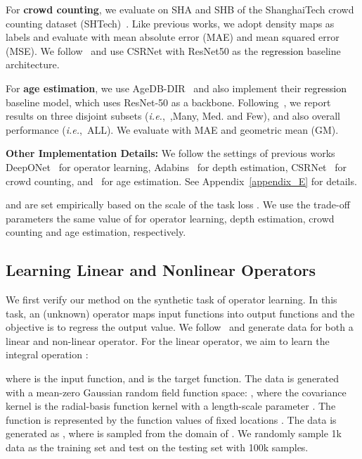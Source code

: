 \documentclass{article} \usepackage{iclr2023_conference,times}
\makeatletter
\newcommand*{\ie}{i.e.\@\xspace}
\def\ie{\mbox{\textit{i.e.}, }}
\def\shihao{\textcolor{black}}
\makeatother
\begin{document}
For \textbf{crowd counting}, we evaluate on SHA and SHB of the ShanghaiTech crowd counting dataset (SHTech)~\citep{zhang2015cross}. Like previous works, we adopt density maps as labels and evaluate with mean absolute error (MAE) and mean squared error (MSE).  We follow~\cite{li2018csrnet} and use CSRNet with ResNet50 as the \shihao{regression} baseline architecture.

For \textbf{age estimation}, we use AgeDB-DIR~\citep{yang2021delving} and also implement their \shihao{regression} baseline model, which uses ResNet-50 as a backbone. Following~\cite{liu2019large}, we report results on three disjoint subsets (\ie,Many, Med. and Few), and also overall performance (\ie ALL). We evaluate with MAE and geometric mean (GM).


\textbf{Other Implementation Details:} We follow the settings of previous works DeepONet~\citep{lu2021learning} for operator learning, Adabins~\citep{bhat2021adabins} for depth estimation, CSRNet~\citep{li2018csrnet} for crowd counting, and~\cite{yang2021delving} for age estimation.  See Appendix~\ref{appendix_E} for details.

 and  are set empirically based on the scale of the task loss .  We use the trade-off parameters  the same value of  for operator learning, depth estimation, crowd counting and age estimation, respectively.


\subsection{Learning Linear and Nonlinear Operators}\label{sec:synthetic}

We first verify our {method} on the synthetic task of operator learning. In this task, an (unknown) operator maps input functions into output functions and the objective is to regress the output value.  We follow~\citep{lu2021learning} and generate data for both a linear and non-linear operator. For the linear operator, we aim to learn the integral operation :

where  is the input function, and  is the target function. The data is generated with a mean-zero Gaussian random field function space: , where the covariance kernel  is the radial-basis function kernel with a length-scale parameter . The function  is represented by the function values of  fixed locations . 
The data is generated as , where  is sampled from the domain of . We randomly sample 1k data as the training set and test on the testing set with 100k samples.
\end{document}
